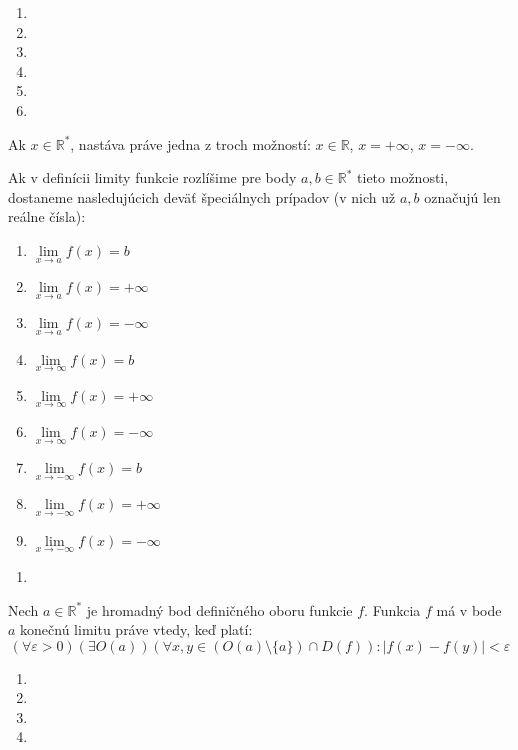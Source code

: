 \begin{enumerate}[resume]
  \item {}
  \item {}
  \item {}
  \item {}
  \item {}
  \item {}
\end{enumerate}

Ak $x \in \mathbb{R^*}$, nastáva práve jedna z troch možností:
$x \in \mathbb{R}$, $x = +\infty$, $x = -\infty$.

Ak v definícii limity funkcie rozlíšime pre body $a, b \in \mathbb{R^*}$ tieto
možnosti, dostaneme nasledujúcich deväť špeciálnych prípadov (v nich už $a, b$
označujú len reálne čísla):

\begin{multicols}{2}
\begin{enumerate}
    \item $\lim\limits_{x \rightarrow a} f(x) = b$
    \item $\lim\limits_{x \rightarrow a} f(x) = +\infty$
    \item $\lim\limits_{x \rightarrow a} f(x) = -\infty$
    \item $\lim\limits_{x \rightarrow \infty} f(x) = b$
    \item $\lim\limits_{x \rightarrow \infty} f(x) = +\infty$
    \item $\lim\limits_{x \rightarrow \infty} f(x) = -\infty$
    \item $\lim\limits_{x \rightarrow -\infty} f(x) = b$
    \item $\lim\limits_{x \rightarrow -\infty} f(x) = +\infty$
    \item $\lim\limits_{x \rightarrow -\infty} f(x) = -\infty$
\end{enumerate}
\end{multicols}

\begin{enumerate}[resume]
  \item {}
\end{enumerate}

\begin{veta}
Nech $a \in \mathbb{R}^*$ je hromadný bod definičného oboru funkcie $f$. Funkcia
$f$ má v bode $a$ konečnú limitu práve vtedy, keď platí:
\[
  (\forall \varepsilon > 0)
    (\exists O(a))
      (\forall x,y \in (O(a) \setminus \{ a \}) \cap D(f))
        : |f(x)-f(y)| < \varepsilon
\]
\end{veta}

\begin{enumerate}[resume]
  \item {}
  \item {}
  \item {}
  \item {}
\end{enumerate}
